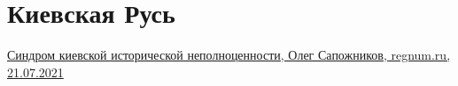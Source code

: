  
 
 
 
 
\chapter{Киевская Русь}


\href{https://regnum.ru/news/polit/3327323.html}{%
Синдром киевской исторической неполноценности, Олег Сапожников, regnum.ru, 21.07.2021%
}
